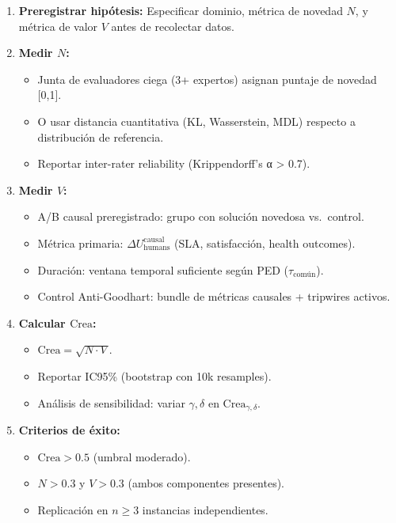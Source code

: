 \begin{enumerate}
\def\labelenumi{\arabic{enumi}.}
\item
  \textbf{Preregistrar hipótesis:} Especificar dominio, métrica de
  novedad \(N\), y métrica de valor \(V\) antes de recolectar datos.
\item
  \textbf{Medir \(N\):}

  \begin{itemize}
  \tightlist
  \item
    Junta de evaluadores ciega (3+ expertos) asignan puntaje de novedad
    {[}0,1{]}.\\
  \item
    O usar distancia cuantitativa (KL, Wasserstein, MDL) respecto a
    distribución de referencia.\\
  \item
    Reportar inter-rater reliability (Krippendorff's α \textgreater{}
    0.7).
  \end{itemize}
\item
  \textbf{Medir \(V\):}

  \begin{itemize}
  \tightlist
  \item
    A/B causal preregistrado: grupo con solución novedosa vs.~control.\\
  \item
    Métrica primaria: \(\Delta U_{\text{humans}}^{\text{causal}}\) (SLA,
    satisfacción, health outcomes).\\
  \item
    Duración: ventana temporal suficiente según PED
    (\(\tau_{\text{común}}\)).\\
  \item
    Control Anti-Goodhart: bundle de métricas causales + tripwires
    activos.
  \end{itemize}
\item
  \textbf{Calcular \(\text{Crea}\):}

  \begin{itemize}
  \tightlist
  \item
    \(\text{Crea} = \sqrt{N \cdot V}\).\\
  \item
    Reportar IC95\% (bootstrap con 10k resamples).\\
  \item
    Análisis de sensibilidad: variar \(\gamma, \delta\) en
    \(\text{Crea}_{\gamma,\delta}\).
  \end{itemize}
\item
  \textbf{Criterios de éxito:}

  \begin{itemize}
  \tightlist
  \item
    \(\text{Crea} > 0.5\) (umbral moderado).\\
  \item
    \(N > 0.3\) y \(V > 0.3\) (ambos componentes presentes).\\
  \item
    Replicación en \(n \geq 3\) instancias independientes.
  \end{itemize}
\end{enumerate}

